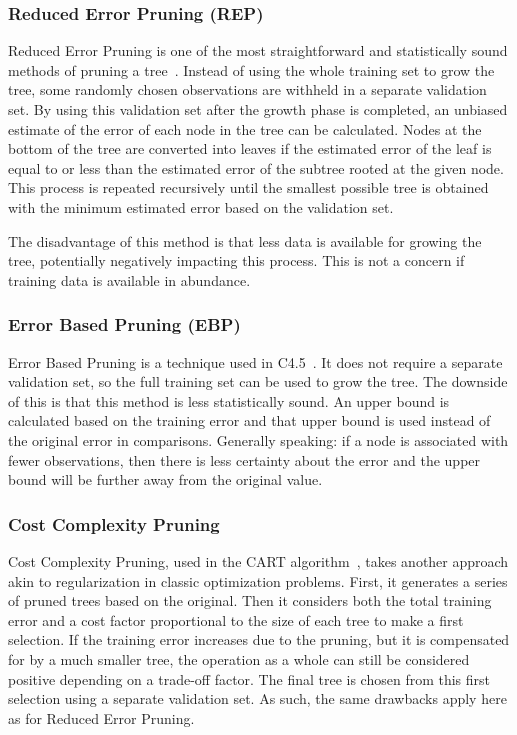 \subsubsection{Reduced Error Pruning (REP)}
Reduced Error Pruning is one of the most straightforward and statistically sound methods of pruning a tree~\cite{quinlan1987simplifying, repanalysis}. Instead of using the whole training set to grow the tree, some randomly chosen observations are withheld in a separate validation set. By using this validation set after the growth phase is completed, an unbiased estimate of the error of each node in the tree can be calculated. Nodes at the bottom of the tree are converted into leaves if the estimated error of the leaf is equal to or less than the estimated error of the subtree rooted at the given node. This process is repeated recursively until the smallest possible tree is obtained with the minimum estimated error based on the validation set.

The disadvantage of this method is that less data is available for growing the tree, potentially negatively impacting this process. This is not a concern if training data is available in abundance.

\subsubsection{Error Based Pruning (EBP)}
Error Based Pruning is a technique used in C4.5~\cite{c45}. It does not require a separate validation set, so the full training set can be used to grow the tree. The downside of this is that this method is less statistically sound. An upper bound is calculated based on the training error and that upper bound is used instead of the original error in comparisons. Generally speaking: if a node is associated with fewer observations, then there is less certainty about the error and the upper bound will be further away from the original value. %

\subsubsection{Cost Complexity Pruning}
Cost Complexity Pruning, used in the CART algorithm~\cite{cart}, takes another approach akin to regularization in classic optimization problems. First, it generates a series of pruned trees based on the original. Then it considers both the total training error and a cost factor proportional to the size of each tree to make a first selection. If the training error increases due to the pruning, but it is compensated for by a much smaller tree, the operation as a whole can still be considered positive depending on a trade-off factor. The final tree is chosen from this first selection using a separate validation set. As such, the same drawbacks apply here as for Reduced Error Pruning.

